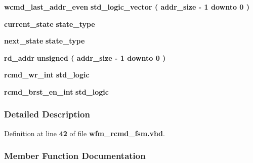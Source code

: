 \begin{DoxyCompactItemize}
\item 
{\bf wcmd\+\_\+last\+\_\+addr\+\_\+even} {\bfseries \textcolor{comment}{std\+\_\+logic\+\_\+vector}\textcolor{vhdlchar}{ }\textcolor{vhdlchar}{(}\textcolor{vhdlchar}{ }\textcolor{vhdlchar}{ }\textcolor{vhdlchar}{ }\textcolor{vhdlchar}{ }{\bfseries {\bf addr\+\_\+size}} \textcolor{vhdlchar}{-\/}\textcolor{vhdlchar}{ } \textcolor{vhdldigit}{1} \textcolor{vhdlchar}{ }\textcolor{keywordflow}{downto}\textcolor{vhdlchar}{ }\textcolor{vhdlchar}{ } \textcolor{vhdldigit}{0} \textcolor{vhdlchar}{ }\textcolor{vhdlchar}{)}\textcolor{vhdlchar}{ }} 
\item 
{\bf current\+\_\+state} {\bfseries {\bfseries {\bf state\+\_\+type}} \textcolor{vhdlchar}{ }} 
\item 
{\bf next\+\_\+state} {\bfseries {\bfseries {\bf state\+\_\+type}} \textcolor{vhdlchar}{ }} 
\item 
{\bf rd\+\_\+addr} {\bfseries \textcolor{comment}{unsigned}\textcolor{vhdlchar}{ }\textcolor{vhdlchar}{(}\textcolor{vhdlchar}{ }\textcolor{vhdlchar}{ }\textcolor{vhdlchar}{ }\textcolor{vhdlchar}{ }{\bfseries {\bf addr\+\_\+size}} \textcolor{vhdlchar}{-\/}\textcolor{vhdlchar}{ } \textcolor{vhdldigit}{1} \textcolor{vhdlchar}{ }\textcolor{keywordflow}{downto}\textcolor{vhdlchar}{ }\textcolor{vhdlchar}{ } \textcolor{vhdldigit}{0} \textcolor{vhdlchar}{ }\textcolor{vhdlchar}{)}\textcolor{vhdlchar}{ }} 
\item 
{\bf rcmd\+\_\+wr\+\_\+int} {\bfseries \textcolor{comment}{std\+\_\+logic}\textcolor{vhdlchar}{ }} 
\item 
{\bf rcmd\+\_\+brst\+\_\+en\+\_\+int} {\bfseries \textcolor{comment}{std\+\_\+logic}\textcolor{vhdlchar}{ }} 
\end{DoxyCompactItemize}


\subsubsection{Detailed Description}


Definition at line {\bf 42} of file {\bf wfm\+\_\+rcmd\+\_\+fsm.\+vhd}.



\subsubsection{Member Function Documentation}
